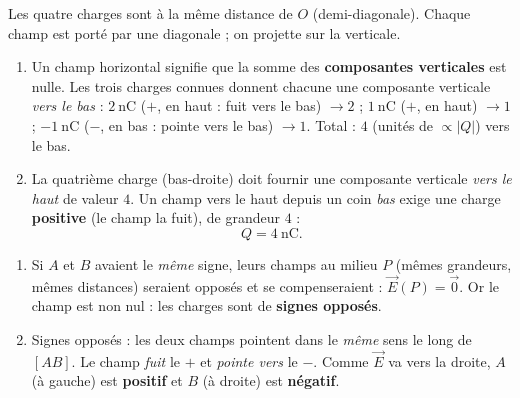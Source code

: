 \documentclass[11pt,a4paper]{article}
\newcommand{\vv}[1]{\vec{#1}}\newcommand{\ds}{\displaystyle}
\begin{document}

\begin{corrige}
Les quatre charges sont à la même distance de $O$ (demi-diagonale). Chaque champ est porté par une
diagonale ; on projette sur la verticale.
\begin{enumerate}[label=\alph*)]
  \item Un champ horizontal signifie que la somme des \textbf{composantes verticales} est nulle.
        Les trois charges connues donnent chacune une composante verticale \emph{vers le bas} :
        $\SI{2}{\nano\coulomb}$ ($+$, en haut : fuit vers le bas) $\to 2$ ;
        $\SI{1}{\nano\coulomb}$ ($+$, en haut) $\to 1$ ;
        $\SI{-1}{\nano\coulomb}$ ($-$, en bas : pointe vers le bas) $\to 1$. Total : $4$ (unités de
        $\propto|Q|$) vers le bas.
  \item La quatrième charge (bas-droite) doit fournir une composante verticale \emph{vers le haut}
        de valeur $4$. Un champ vers le haut depuis un coin \emph{bas} exige une charge
        \textbf{positive} (le champ la fuit), de grandeur $4$ :
        \[ \boxed{Q = \SI{+4}{\nano\coulomb}}. \]
\end{enumerate}
\end{corrige}

\begin{corrige}
\begin{enumerate}[label=\alph*)]
  \item Si $A$ et $B$ avaient le \emph{même} signe, leurs champs au milieu $P$ (mêmes grandeurs,
        mêmes distances) seraient opposés et se compenseraient : $\vv{E}(P) = \vv{0}$. Or le champ
        est non nul : les charges sont de \textbf{signes opposés}.
  \item Signes opposés : les deux champs pointent dans le \emph{même} sens le long de $[AB]$. Le
        champ \emph{fuit} le $+$ et \emph{pointe vers} le $-$. Comme $\vv{E}$ va vers la droite,
        $A$ (à gauche) est \textbf{positif} et $B$ (à droite) est \textbf{négatif}.
\end{enumerate}
\end{corrige}
\end{document}

